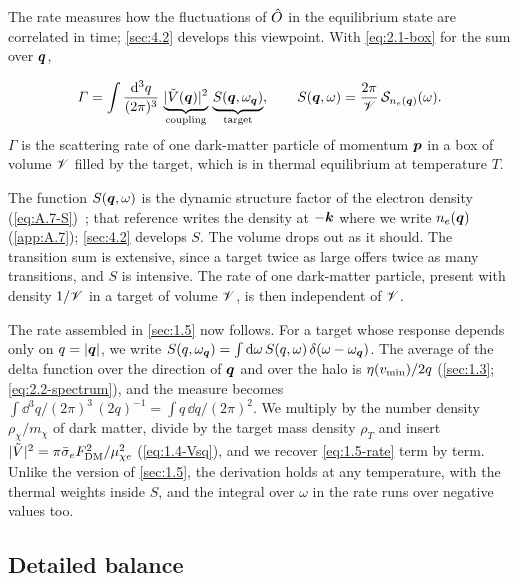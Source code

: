 The rate measures how the fluctuations of $\hat{O}$ in the equilibrium state are correlated in time; \cref{sec:4.2} develops this viewpoint. With \cref{eq:2.1-box} for the sum over $\bm{q}$,
\begin{keyresult}
\begin{equation}
  \varGamma = \int\frac{\mathrm{d}^3q}{(2\pi)^3}\,\underbrace{|\tilde V(\bm{q})|^2}_{\text{coupling}}\,\underbrace{S(\bm{q},\omega_{\bm{q}})}_{\text{target}}, \qquad
  S(\bm{q},\omega) = \frac{2\pi}{\mathscr{V}}\,\mathcal{S}_{n_e(\bm{q})}(\omega) .
  \label{eq:2.5-golden}
\end{equation}
$\varGamma$ is the scattering rate of one dark-matter particle of momentum $\bm{p}$ in a box of volume $\mathscr{V}$ filled by the target, which is in thermal equilibrium at temperature $T$.
\end{keyresult}
The function $S(\bm{q},\omega)$ is the dynamic structure factor of the electron density (\cref{eq:A.7-S})~\cite[Eq.~(4)]{knapen2021dark}; that reference writes the density at $-\bm{k}$ where we write $n_e(\bm{q})$ (\cref{app:A.7}); \cref{sec:4.2} develops $S$. The volume drops out as it should. The transition sum is extensive, since a target twice as large offers twice as many transitions, and $S$ is intensive. The rate of one dark-matter particle, present with density $1/\mathscr{V}$ in a target of volume $\mathscr{V}$, is then independent of $\mathscr{V}$.

The rate assembled in \cref{sec:1.5} now follows. For a target whose response depends only on $q = |\bm{q}|$, we write $S(q,\omega_{\bm{q}}) = \int\mathrm{d}\omega\,S(q,\omega)\,\delta(\omega - \omega_{\bm{q}})$. The average of the delta function over the direction of $\bm{q}$ and over the halo is $\eta(v_{\mathrm{min}})/2q$ (\cref{sec:1.3}; \cref{eq:2.2-spectrum}), and the measure becomes $\int\dd^3q/(2\pi)^3\,(2q)^{-1} = \int q\,\dd q/(2\pi)^2$. We multiply by the number density $\rho_\chi/m_\chi$ of dark matter, divide by the target mass density $\rho_T$ and insert $|\tilde V|^2 = \pi\bar{\sigma}_{e}F_{\mathrm{DM}}^2/\mu_{\chi e}^2$ (\cref{eq:1.4-Vsq}), and we recover \cref{eq:1.5-rate} term by term. Unlike the version of \cref{sec:1.5}, the derivation holds at any temperature, with the thermal weights inside $S$, and the integral over $\omega$ in the rate runs over negative values too.

\subsection{Detailed balance}

